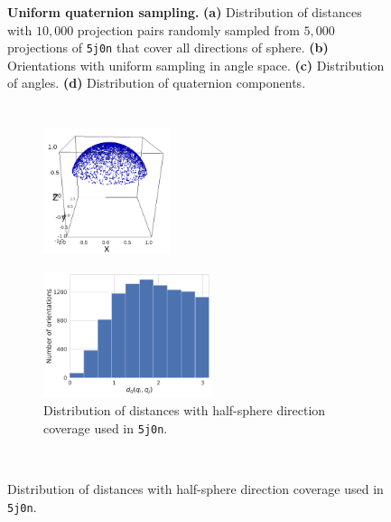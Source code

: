 \begin{figure}[ht!]
     \caption{
        \textbf{Uniform quaternion sampling.} \textbf{(a)} Distribution of distances with $10,000$ projection pairs randomly sampled from $5,000$ projections of \texttt{5j0n} that cover all directions of sphere. \textbf{(b)} Orientations with uniform sampling in angle space. \textbf{(c)} Distribution of angles. \textbf{(d)} Distribution of quaternion components.
        }\label{fig:uniform-angles}
\end{figure}

\newpage
\section{}\label{apx:orientation-constraints}

\begin{figure}[ht!]
    \centering
    \begin{subfigure}[b]{0.45\linewidth}
        \centering
        \includegraphics[height=10em]{figures/5j0n-half.png}
        \caption{}%
    \end{subfigure}
    \hfill
    \begin{subfigure}[b]{0.45\linewidth}
        \centering
        \includegraphics[height=10em]{figures/dQ_5j0n_half.pdf}
        \caption{Distribution of distances with half-sphere direction coverage used in \texttt{5j0n}.}%
    \end{subfigure}
    
    \\ \vspace{1em}
    

\end{figure}
